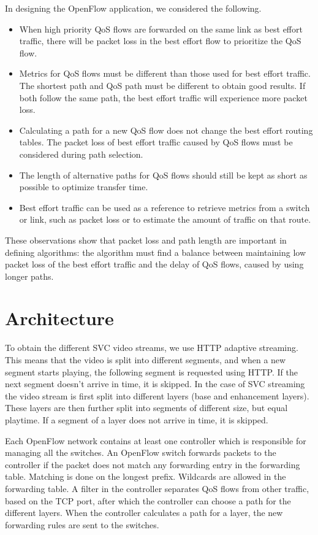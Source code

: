 \documentclass[conference]{IEEEtran}
\begin{document}
In designing the OpenFlow application, we considered the following.
\begin{itemize}
	\item When high priority QoS flows are forwarded on the same link as best effort traffic, there will be packet loss in the best effort flow to prioritize the QoS flow.
	\item Metrics for QoS flows must be different than those used for best effort traffic. The shortest path and QoS path must be different to obtain good results. 
	If both follow the same path, the best effort traffic will experience more packet loss.
	\item Calculating a path for a new QoS flow does not change the best effort routing tables. The packet loss of best effort traffic caused by QoS flows must be considered during path selection.
	\item The length of alternative paths for QoS flows should still be kept as short as possible to optimize transfer time.
	\item Best effort traffic can be used as a reference to retrieve metrics from a switch or link, such as packet loss or to estimate the amount of traffic on that route.
\end{itemize}

These observations show that packet loss and path length are important in defining algorithms: 
the algorithm must find a balance between maintaining low packet loss of the best effort 
traffic and the delay of QoS flows, caused by using longer paths.

\section{Architecture}

To obtain the different SVC video streams, we use HTTP adaptive streaming.
This means that the video is split into different segments, and when a new segment starts playing, 
the following segment is requested using HTTP. 
If the next segment doesn't arrive in time, it is skipped.
In the case of SVC streaming the video stream is first split into different layers (base and enhancement layers).
These layers are then further split into segments of different size, but equal playtime.
If a segment of a layer does not arrive in time, it is skipped.

Each OpenFlow network contains at least one controller which is responsible for managing all the switches. 
An OpenFlow switch forwards packets 
to the controller if the packet does not match any forwarding entry in the forwarding table.
Matching is done on the longest prefix. Wildcards are allowed in the forwarding table.
A filter in the controller separates QoS flows from 
other traffic, based on the TCP port, after which the controller can choose a path for the different layers. 
When the controller calculates a path for a layer, the new forwarding rules are sent to the switches.
\end{document}
